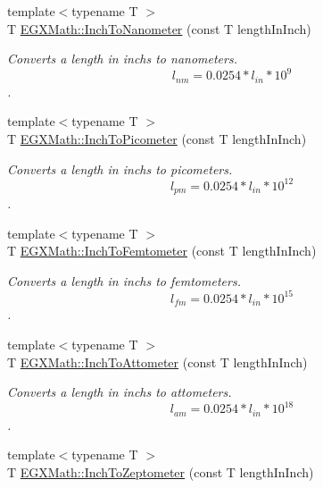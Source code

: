 \begin{DoxyCompactItemize}
{\footnotesize template$<$typename T $>$ }\\T \mbox{\hyperlink{group___e_g_x_math-_conversions-_length_conversions-_imperial-_inch-_s_i_gac4c0a73502ca20ec1a44748725c333ad}{E\+G\+X\+Math\+::\+Inch\+To\+Nanometer}} (const T length\+In\+Inch)
\begin{DoxyCompactList}\small\item\em Converts a length in inchs to nanometers. \[ l_{nm}=0.0254 * l_{in} * 10^{9} \]. \end{DoxyCompactList}\item 
{\footnotesize template$<$typename T $>$ }\\T \mbox{\hyperlink{group___e_g_x_math-_conversions-_length_conversions-_imperial-_inch-_s_i_ga4220728877d0369e359689a0d8f8207c}{E\+G\+X\+Math\+::\+Inch\+To\+Picometer}} (const T length\+In\+Inch)
\begin{DoxyCompactList}\small\item\em Converts a length in inchs to picometers. \[ l_{pm}=0.0254 * l_{in} * 10^{12} \]. \end{DoxyCompactList}\item 
{\footnotesize template$<$typename T $>$ }\\T \mbox{\hyperlink{group___e_g_x_math-_conversions-_length_conversions-_imperial-_inch-_s_i_gaef29e83d5736f037b666310a5f08db43}{E\+G\+X\+Math\+::\+Inch\+To\+Femtometer}} (const T length\+In\+Inch)
\begin{DoxyCompactList}\small\item\em Converts a length in inchs to femtometers. \[ l_{fm}=0.0254 * l_{in} * 10^{15} \]. \end{DoxyCompactList}\item 
{\footnotesize template$<$typename T $>$ }\\T \mbox{\hyperlink{group___e_g_x_math-_conversions-_length_conversions-_imperial-_inch-_s_i_ga884865df95828abbf92a65e2ad67538a}{E\+G\+X\+Math\+::\+Inch\+To\+Attometer}} (const T length\+In\+Inch)
\begin{DoxyCompactList}\small\item\em Converts a length in inchs to attometers. \[ l_{am}=0.0254 * l_{in} * 10^{18} \]. \end{DoxyCompactList}\item 
{\footnotesize template$<$typename T $>$ }\\T \mbox{\hyperlink{group___e_g_x_math-_conversions-_length_conversions-_imperial-_inch-_s_i_ga05a90a292ba82b7b777c90c95224c323}{E\+G\+X\+Math\+::\+Inch\+To\+Zeptometer}} (const T length\+In\+Inch)

\end{DoxyCompactItemize}
